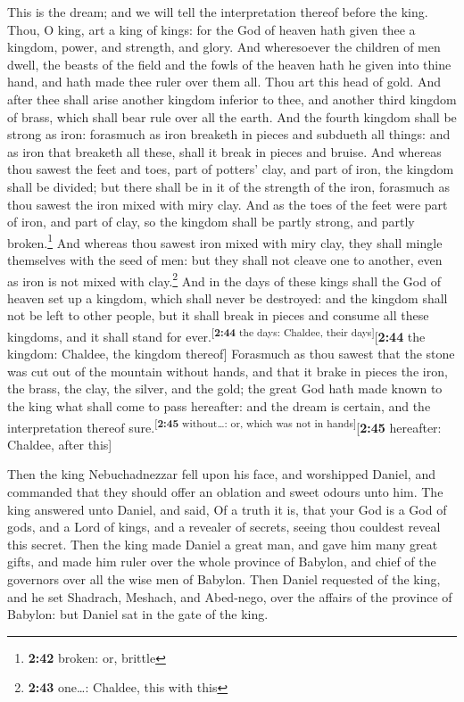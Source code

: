  This is the dream; and we will tell the interpretation
thereof before the king.  Thou, O king, art a king of
kings: for the God of heaven hath given thee a kingdom, power, and
strength, and glory.  And wheresoever the children of men
dwell, the beasts of the field and the fowls of the heaven hath he given
into thine hand, and hath made thee ruler over them all. Thou art this
head of gold.  And after thee shall arise another kingdom
inferior to thee, and another third kingdom of brass, which shall bear
rule over all the earth.  And the fourth kingdom shall be
strong as iron: forasmuch as iron breaketh in pieces and subdueth all
things: and as iron that breaketh all these, shall it break in pieces
and bruise.  And whereas thou sawest the feet and toes,
part of potters' clay, and part of iron, the kingdom shall be divided;
but there shall be in it of the strength of the iron, forasmuch as thou
sawest the iron mixed with miry clay.  And as the toes of
the feet were part of iron, and part of clay, so the kingdom shall be
partly strong, and partly broken.\footnote{\textbf{2:42} broken: or,
  brittle}  And whereas thou sawest iron mixed with miry
clay, they shall mingle themselves with the seed of men: but they shall
not cleave one to another, even as iron is not mixed with
clay.\footnote{\textbf{2:43} one\ldots: Chaldee, this with this}
 And in the days of these kings shall the God of heaven
set up a kingdom, which shall never be destroyed: and the kingdom shall
not be left to other people, but it shall break in pieces and consume
all these kingdoms, and it shall stand for
ever.\textsuperscript{{[}\textbf{2:44} the days: Chaldee, their
days{]}}{[}\textbf{2:44} the kingdom: Chaldee, the kingdom thereof{]}
 Forasmuch as thou sawest that the stone was cut out of
the mountain without hands, and that it brake in pieces the iron, the
brass, the clay, the silver, and the gold; the great God hath made known
to the king what shall come to pass hereafter: and the dream is certain,
and the interpretation thereof sure.\textsuperscript{{[}\textbf{2:45}
without\ldots: or, which was not in hands{]}}{[}\textbf{2:45} hereafter:
Chaldee, after this{]}

 Then the king Nebuchadnezzar fell upon his face, and
worshipped Daniel, and commanded that they should offer an oblation and
sweet odours unto him.  The king answered unto Daniel,
and said, Of a truth it is, that your God is a God of gods, and a Lord
of kings, and a revealer of secrets, seeing thou couldest reveal this
secret.  Then the king made Daniel a great man, and gave
him many great gifts, and made him ruler over the whole province of
Babylon, and chief of the governors over all the wise men of Babylon.
 Then Daniel requested of the king, and he set Shadrach,
Meshach, and Abed-nego, over the affairs of the province of Babylon: but
Daniel sat in the gate of the king.


